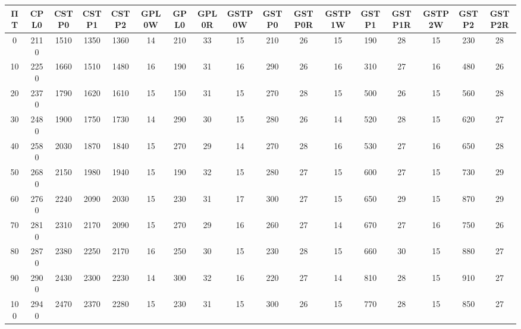 \begin{tabular}{|c|c|c|c|c|c|c|c|c|c|c|c|c|c|c|c|c|}
\hline
ΠΤ&CPL0&CSTP0&CSTP1&CSTP2&GPL0W&GPL0&GPL0R&GSTP0W&GSTP0&GSTP0R&GSTP1W&GSTP1&GSTP1R&GSTP2W&GSTP2&GSTP2R\\\hline
\hline
0&2110&1510&1350&1360&14&210&33&15&210&26&15&190&28&15&230&28\\
\hline
10&2250&1660&1510&1480&16&190&31&16&290&26&16&310&27&16&480&26\\
\hline
20&2370&1790&1620&1610&15&150&31&15&270&28&15&500&26&15&560&28\\
\hline
30&2480&1900&1750&1730&14&290&30&15&280&26&14&520&28&15&620&27\\
\hline
40&2580&2030&1870&1840&15&270&29&14&270&28&16&530&27&16&650&28\\
\hline
50&2680&2150&1980&1940&15&190&32&15&280&27&15&600&27&15&730&29\\
\hline
60&2760&2240&2090&2030&15&230&31&17&300&27&15&650&29&15&870&29\\
\hline
70&2810&2310&2170&2090&15&270&29&16&260&27&14&670&27&16&750&26\\
\hline
80&2870&2380&2250&2170&16&250&30&15&230&28&15&660&30&15&880&27\\
\hline
90&2900&2430&2300&2230&14&300&32&16&220&27&14&810&28&15&910&27\\
\hline
100&2940&2470&2370&2280&15&230&31&15&300&26&15&770&28&15&850&27\\
\hline
\end{tabular}
